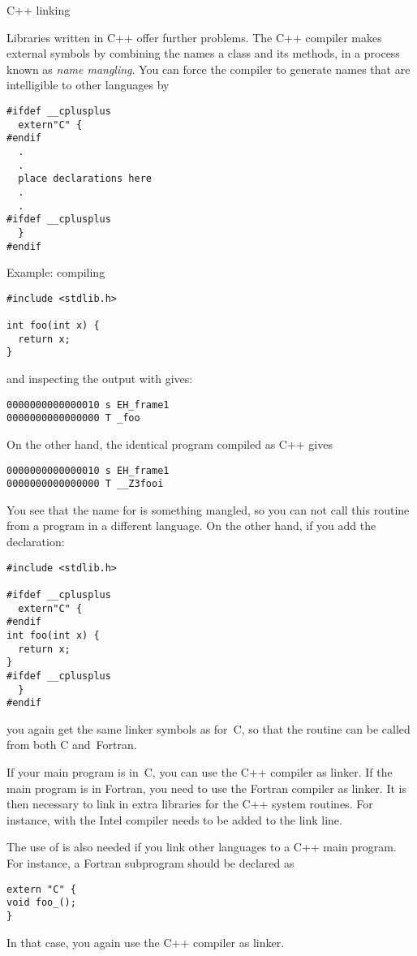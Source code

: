  {C++ linking}

Libraries written in C++ offer further problems.
The C++ compiler makes external symbols by combining
the names a class and its methods, in a process known
as \emph{name mangling}.
You can force the compiler to
generate names that are intelligible to other languages by
\begin{verbatim}
#ifdef __cplusplus
  extern"C" {
#endif
  .
  .
  place declarations here
  .
  .
#ifdef __cplusplus
  }
#endif
\end{verbatim}

Example:
compiling
\begin{verbatim}
#include <stdlib.h>

int foo(int x) {
  return x;
}
\end{verbatim}
and inspecting the output with  gives:
\begin{verbatim}
0000000000000010 s EH_frame1
0000000000000000 T _foo
\end{verbatim}
On the other hand, the identical program compiled as C++ gives
\begin{verbatim}
0000000000000010 s EH_frame1
0000000000000000 T __Z3fooi
\end{verbatim}
You see that the name for  is something mangled, so you can not call 
this routine from a program in a different language. On the other hand,
if you add the  declaration:
\begin{verbatim}
#include <stdlib.h>

#ifdef __cplusplus
  extern"C" {
#endif
int foo(int x) {
  return x;
}
#ifdef __cplusplus
  }
#endif
\end{verbatim}
you again get the same linker symbols as for~C, so that the routine
can be called from both C and~Fortran.

If your main program is in~C, you can use the C++ compiler as linker.
If the main program is in Fortran, you need to use the Fortran
compiler as linker. It is then necessary to link in extra
libraries for the C++ system routines. For instance, with the 
Intel compiler  needs to be added to the link line.

The use of  is also needed if you link other languages to a
C++ main program. For instance, a Fortran subprogram  should be
declared as
\begin{verbatim}
extern "C" {
void foo_();
}
\end{verbatim}
In that case, you again use the C++ compiler as linker.

